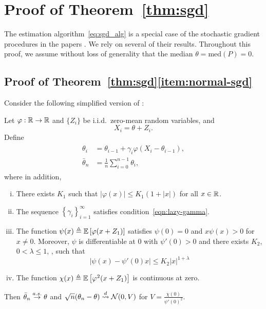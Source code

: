 \section{Proof of Theorem~\ref{thm:sgd}}
\label{proof:sgd}

The estimation algorithm~\eqref{eq:sgd_alg} is a special
case of the stochastic gradient procedures in the papers
\cite{polyak1992acceleration, polyak1990new}.
We rely on several of their results. Throughout this proof,
we assume without loss of generality that the median
$\theta = \mbox{med}(P) = 0$.

\subsection{Proof of Theorem~\ref{thm:sgd}\eqref{item:normal-sgd}}
\label{sec:proof-normal-sgd}

Consider the following simplified version of
\cite[Thm. 4]{polyak1992acceleration}:
\begin{corollary}{\cite[Thms. 3 \& 4]{polyak1992acceleration}}
  \label{corollary:polyak-juditsky}
  Let $\varphi : \mathbb{R} \to \mathbb{R}$ and $\{Z_i\}$ be i.i.d.\ zero-mean random
  variables, and
  \begin{equation*}
  X_i = \theta + Z_i.
  \end{equation*}
  Define
  \begin{align}
    \begin{split}
      \theta_i & = \theta_{i-1} + \gamma_i \varphi(X_i - \theta_{i-1}), \\
      \bar{\theta}_n & = \frac{1}{n} \sum_{i=0}^{n-1} \theta_i, 
    \end{split}
    \label{eq:Polyak_Juditsky_alg}
  \end{align}
  where in addition,
  \begin{enumerate}[(i)]
  \item There exists $K_1$ such that $\left| \varphi(x) \right| \leq
    K_1(1+|x|)$ for all $x\in \mathbb{R}$.
  \item The sequence $\left\{ \gamma_i \right\}_{i=1}^\infty$ satisfies
    condition~\eqref{eqn:lazy-gamma}.
  \item \label{item:zero-gradient}
    The function $\psi(x) \triangleq \mathbb{E}\left[  \varphi(x+Z_1)\right]$
    satisfies $\psi(0) = 0$ and
    $x\psi(x) > 0$ for $x\neq 0$. Moreover, $\psi$ is differentiable
    at 0 with $\psi'(0) > 0$ and there exists
    $K_2$, $0 < \lambda \leq 1$, , such that
    \begin{equation}
      \label{eqn:local-hessian-psi}
        \left| \psi(x) - \psi'(0)x \right|\leq K_2 |x|^{1+\lambda}
    \end{equation}
  \item The function 
    $\chi(x) \triangleq \mathbb{E}\left[ \varphi^2(x+Z_1)\right]$ is continuous at zero. 
  \end{enumerate}
  Then $\bar{\theta}_n \stackrel{a.s.}{\rightarrow} \theta$ and $ \sqrt{n}({\theta}_n - \theta)
  \stackrel{d}{\rightsquigarrow} \mathcal{N}(0,V)$ for
  $V = \frac{ \chi(0)} {\psi'(0)^2}$.
\end{corollary}

